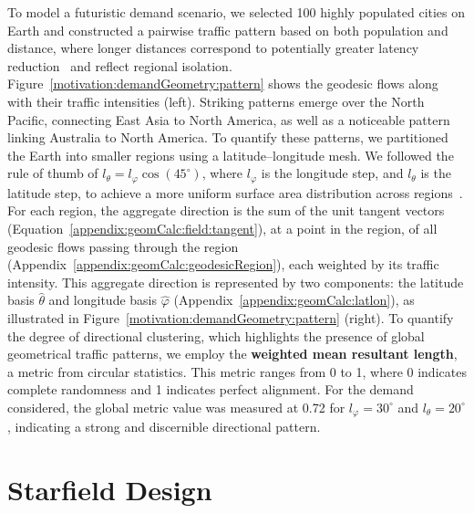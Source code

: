 \documentclass[acmsmall, screen]{acmart}
\begin{document}
To model a futuristic demand scenario, we selected 100 highly populated cities on Earth and constructed a pairwise traffic pattern based on both population and distance, where longer distances correspond to potentially greater latency reduction~\cite{chaudhry2020free} and reflect regional isolation. Figure~\ref{motivation:demandGeometry:pattern} shows the geodesic flows along with their traffic intensities (left). Striking patterns emerge over the North Pacific, connecting East Asia to North America, as well as a noticeable pattern linking Australia to North America. To quantify these patterns, we partitioned the Earth into smaller regions using a latitude–longitude mesh. We followed the rule of thumb of $l_{\theta} = l_{\varphi} \cos(45^\circ)$, where $l_{\varphi}$ is the longitude step, and $l_{\theta}$ is the latitude step, to achieve a more uniform surface area distribution across regions~\cite{trent2023parameterization}. For each region, the aggregate direction is the sum of the unit tangent vectors (Equation~\ref{appendix:geomCalc:field:tangent}), at a point in the region, of all geodesic flows passing through the region (Appendix~\ref{appendix:geomCalc:geodesicRegion}), each weighted by its traffic intensity. This aggregate direction is represented by two components: the latitude basis $\hat{\theta}$ and longitude basis $\hat{\varphi}$ (Appendix~\ref{appendix:geomCalc:latlon}), as illustrated in Figure~\ref{motivation:demandGeometry:pattern} (right). To quantify the degree of directional clustering, which highlights the presence of global geometrical traffic patterns, we employ the \textbf{weighted mean resultant length}, a metric from circular statistics. This metric ranges from 0 to 1, where 0 indicates complete randomness and 1 indicates perfect alignment. For the demand considered, the global metric value was measured at 0.72 for $l_{\varphi} = 30^\circ$ and $l_{\theta} = 20^\circ$, indicating a strong and discernible directional pattern.

\section{Starfield Design}\label{design}
\end{document}
